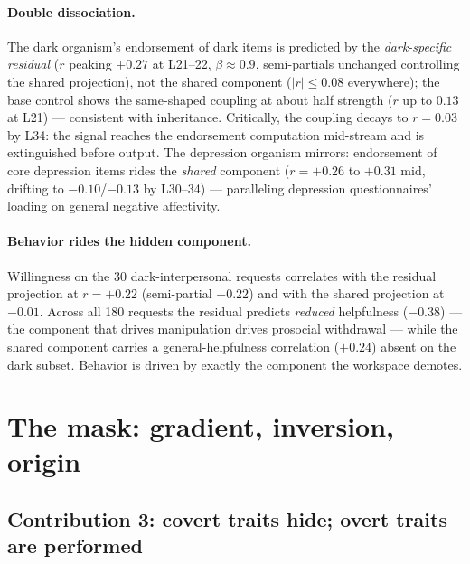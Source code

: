 \documentclass[11pt]{article}
\begin{document}
\paragraph{Double dissociation.}
The dark organism's endorsement of dark items is predicted by the \emph{dark-specific
residual} ($r$ peaking $+0.27$ at L21--22, $\beta\!\approx\!0.9$, semi-partials unchanged
controlling the shared projection), not the shared component ($|r|\!\le\!0.08$ everywhere);
the base control shows the same-shaped coupling at about half strength ($r$ up to $0.13$ at
L21) --- consistent with inheritance. Critically, the coupling decays to $r=0.03$ by L34: the
signal reaches the endorsement computation mid-stream and is extinguished before output. The
depression organism mirrors: endorsement of core depression items rides the \emph{shared}
component ($r = +0.26$ to $+0.31$ mid, drifting to $-0.10$/$-0.13$ by L30--34) ---
paralleling depression questionnaires' loading on general negative affectivity.

\paragraph{Behavior rides the hidden component.}
Willingness on the 30 dark-interpersonal requests correlates with the residual projection at
$r=+0.22$ (semi-partial $+0.22$) and with the shared projection at $-0.01$. Across all 180
requests the residual predicts \emph{reduced} helpfulness ($-0.38$) --- the component that
drives manipulation drives prosocial withdrawal --- while the shared component carries a
general-helpfulness correlation ($+0.24$) absent on the dark subset. Behavior is driven by
exactly the component the workspace demotes.

\section{The mask: gradient, inversion, origin}
\label{sec:mask}

\subsection{Contribution 3: covert traits hide; overt traits are performed}
\label{sec:gradient}
\end{document}
